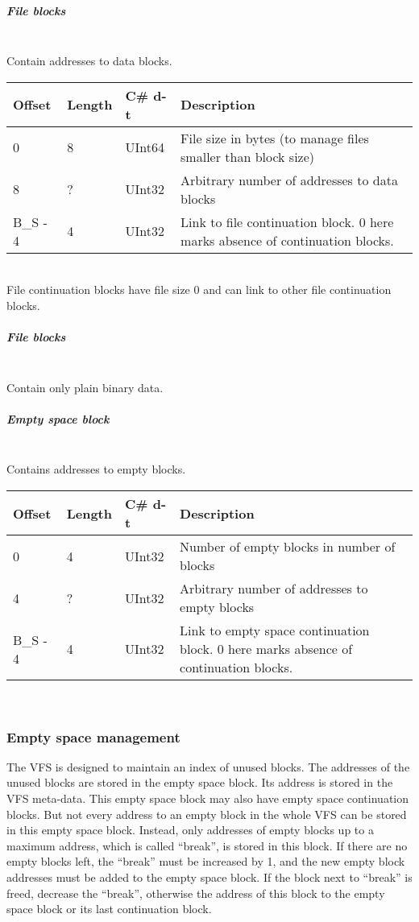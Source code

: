 \documentclass[a4paper,12pt]{article}
\begin{document}
\subparagraph{File blocks} \mbox{} \\

Contain addresses to data blocks.\\

\begin{tabular}{|p{1.5cm}|p{1.5cm}|p{1.5cm}|p{7cm}|}\hline
Offset 	&Length	&C\# d-t	&Description\\\hline
0	&8	&UInt64	&File size in bytes (to manage files smaller than block size)\\
8	&?	&UInt32	&Arbitrary number of addresses to data blocks\\
B\_S - 4	&4	&UInt32	&Link to file continuation block. 0 here marks absence of continuation blocks.\\\hline
\end{tabular} \\

File continuation blocks have file size 0 and can link to other file continuation blocks.

\subparagraph{File blocks} \mbox{} \\

Contain only plain binary data.

\subparagraph{Empty space block} \mbox{} \\

Contains addresses to empty blocks.\\

\begin{tabular}{|p{1.5cm}|p{1.5cm}|p{1.5cm}|p{7cm}|}\hline
Offset 	&Length	&C\# d-t	&Description\\\hline
0	&4	&UInt32	&Number of empty blocks in number of blocks\\
4	&?	&UInt32	&Arbitrary number of addresses to empty blocks\\
B\_S - 4	&4	&UInt32	&Link to empty space continuation block. 0 here marks absence of continuation blocks.\\\hline
\end{tabular} \\

\subsubsection{Empty space management}

The VFS is designed to maintain an index of unused blocks. The addresses of the unused blocks are stored in the empty space block. Its address is stored in the VFS meta-data. This empty space block may also have empty space continuation blocks. But not every address to an empty block in the whole VFS can be stored in this empty space block. Instead, only addresses of empty blocks up to a maximum address, which is called “break”, is stored in this block. If there are no empty blocks left, the “break” must be increased by 1, and the new empty block addresses must be added to the empty space block. If the block next to “break” is freed, decrease the “break”, otherwise the address of this block to the empty space block or its last continuation block.
\end{document}
